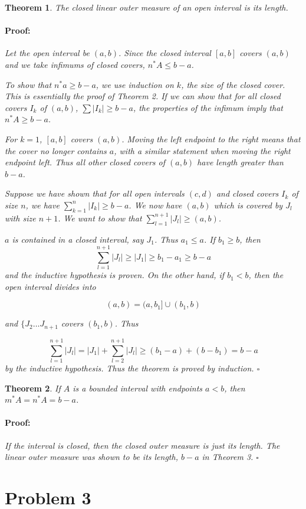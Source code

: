 \documentclass{article}
\newenvironment{proof}{\paragraph{Proof:}}{\hfill$\square$}
\newtheorem{theorem}{Theorem}
\begin{document}
\begin{theorem}
The closed linear outer measure of an open interval is its length.
\begin{proof}
Let the open interval be $(a, b)$. Since the closed interval $[a, b]$ covers $(a, b)$ and we take infimums of closed covers, $n^*A \leq b-a$.

To show that $n^*a \geq b-a$, we use induction on $k$, the size of the closed cover. This is essentially the proof of Theorem 2. If we can show that for all closed covers $I_k$ of $(a, b)$, $\sum |I_k| \geq b-a$, the properties of the infimum imply that $n^*A \geq b-a$.

For $k=1$, $[a, b]$ covers $(a, b)$. Moving the left endpoint to the right means that the cover no longer contains $a$, with a similar statement when moving the right endpoint left. Thus all other closed covers of $(a, b)$ have length greater than $b-a$.

Suppose we have shown that for all open intervals $(c, d)$ and closed covers $I_k$ of size $n$, we have $\sum_{k=1}^n |I_k| \geq b-a$. We now have $(a, b)$ which is covered by $J_l$ with size $n+1$. We want to show that $\sum_{l=1}^{n+1} |J_l| \geq (a, b)$.

$a$ is contained in a closed interval, say $J_1$. Thus $a_1 \leq a$. If $b_1 \geq b$, then
\[
\sum_{l=1}^{n+1} |J_l| \geq |J_1| \geq b_1 - a_1 \geq b - a
\]
and the inductive hypothesis is proven. On the other hand, if $b_1 < b$, then the open interval divides into

\[
(a, b) = (a, b_1] \cup (b_1, b)
\]

and $\{J_2 \dots J_{n+1}$ covers $(b_1, b)$. Thus

\[
\sum_{l=1}^{n+1} |J_l| = |J_1| + \sum_{l=2}^{n+1} |J_l| \geq (b_1 - a) + (b-b_1) = b-a
\]
by the inductive hypothesis. Thus the theorem is proved by induction.
\end{proof}
\end{theorem}

\begin{theorem}
If $A$ is a bounded interval with endpoints $a < b$, then $m^*A = n^*A = b-a$.
\begin{proof}
If the interval is closed, then the closed outer measure is just its length. The linear outer measure was shown to be its length, $b-a$ in Theorem 3.
\end{proof}
\end{theorem}

\section*{Problem 3}
\end{document}
